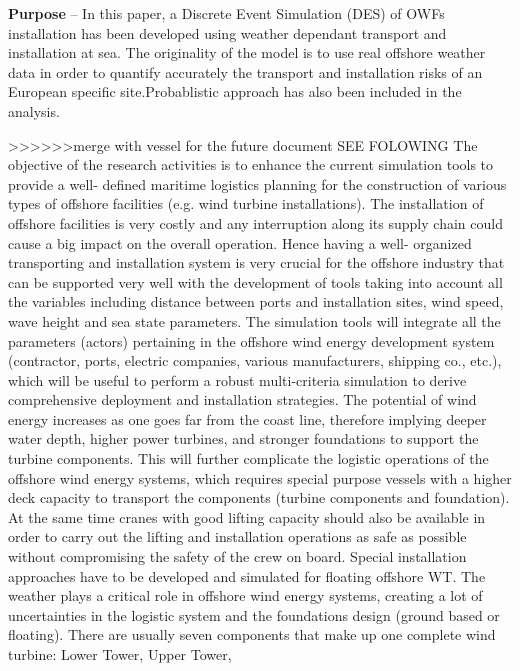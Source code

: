 \textbf{Purpose} --
In this paper, a Discrete Event Simulation (DES) of OWFs installation has been developed using weather dependant transport and installation at sea. The originality of the model is to use real offshore weather data in order to quantify accurately the transport and installation risks of an European specific site.Probablistic approach has also been included in the analysis.


>>>>>>merge with vessel for the future document SEE FOLOWING
The objective of the research activities is to enhance the current simulation tools to provide a well- defined maritime logistics planning for the
construction of various types of offshore facilities (e.g. wind turbine installations). The installation of offshore facilities is very costly and any
interruption along its supply chain could cause a big impact on the overall operation. Hence having a well- organized transporting and installation
system is very crucial for the offshore industry that can be supported very well with the development of tools taking into account all the variables
including distance between ports and installation sites, wind speed, wave height and sea state parameters. The simulation tools will integrate all
the parameters (actors) pertaining in the offshore wind energy development system (contractor, ports, electric companies, various
manufacturers, shipping co., etc.), which will be useful to perform a robust multi-criteria simulation to derive comprehensive deployment and
installation strategies.
The potential of wind energy increases as one goes far from the coast line, therefore implying deeper water depth, higher power turbines, and
stronger foundations to support the turbine components. This will further complicate the logistic operations of the offshore wind energy systems,
which requires special purpose vessels with a higher deck capacity to transport the components (turbine components and foundation). At the
same time cranes with good lifting capacity should also be available in order to carry out the lifting and installation operations as safe as possible
without compromising the safety of the crew on board. Special installation approaches have to be developed and simulated for floating offshore
WT. The weather plays a critical role in offshore wind energy systems, creating a lot of uncertainties in the logistic system and the foundations
design (ground based or floating). There are usually seven components that make up one complete wind turbine: Lower Tower, Upper Tower,
